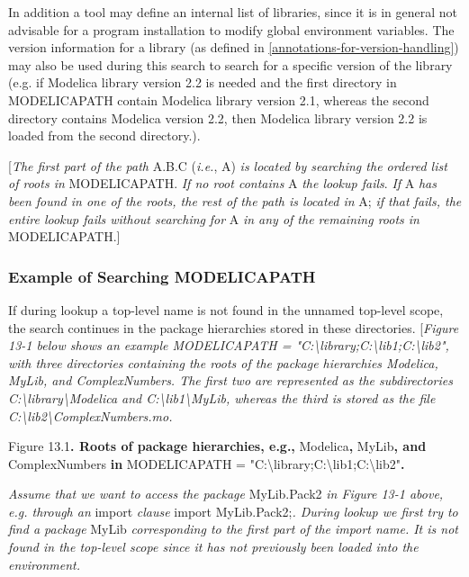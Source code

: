 In addition a tool may define an internal list of libraries, since it is
in general not advisable for a program installation to modify global
environment variables. The version information for a library (as defined
in \ref{annotations-for-version-handling}) may also be used during this search to search for a
specific version of the library (e.g. if Modelica library version 2.2 is
needed and the first directory in MODELICAPATH contain Modelica library
version 2.1, whereas the second directory contains Modelica version 2.2,
then Modelica library version 2.2 is loaded from the second directory.).

{[}\emph{The first part of the path} A.B.C (\emph{i.e.}, A) \emph{is
located by searching the ordered list of roots in} MODELICAPATH.
\emph{If no root contains} A \emph{the lookup fails}. \emph{If} A
\emph{has been found in one of the roots, the rest of the path is
located in} A; \emph{if that fails, the entire lookup fails without
searching} \emph{for} A \emph{in any of the remaining roots in}
MODELICAPATH.{]}

\subsubsection{Example of Searching MODELICAPATH}

If during lookup a top-level name is not found in the unnamed top-level
scope, the search continues in the package hierarchies stored in these
directories. {[}\emph{Figure 13-1 below shows an example MODELICAPATH =
"C:\textbackslash{}library;C:\textbackslash{}lib1;C:\textbackslash{}lib2",
with three directories containing the roots of the package hierarchies
Modelica, MyLib, and ComplexNumbers. The first two are represented as
the subdirectories C:\textbackslash{}library\textbackslash{}Modelica and
C:\textbackslash{}lib1\textbackslash{}MyLib, whereas the third is stored
as the file C:\textbackslash{}lib2\textbackslash{}ComplexNumbers.mo.}

Figure 13.1\textbf{. Roots of package hierarchies, e.g.,}
Modelica\textbf{,} MyLib\textbf{, and} ComplexNumbers \textbf{in}
MODELICAPATH =
"C:\textbackslash{}library;C:\textbackslash{}lib1;C:\textbackslash{}lib2"\textbf{.}

\emph{Assume that we want to access the package} MyLib.Pack2 \emph{in
Figure 13-1 above, e.g. through an} import \emph{clause} import
MyLib.Pack2;\emph{. During lookup we first try to find a package} MyLib
\emph{corresponding to the first part of the import name. It is not
found in the top-level scope since it has not previously been loaded
into the environment. }

